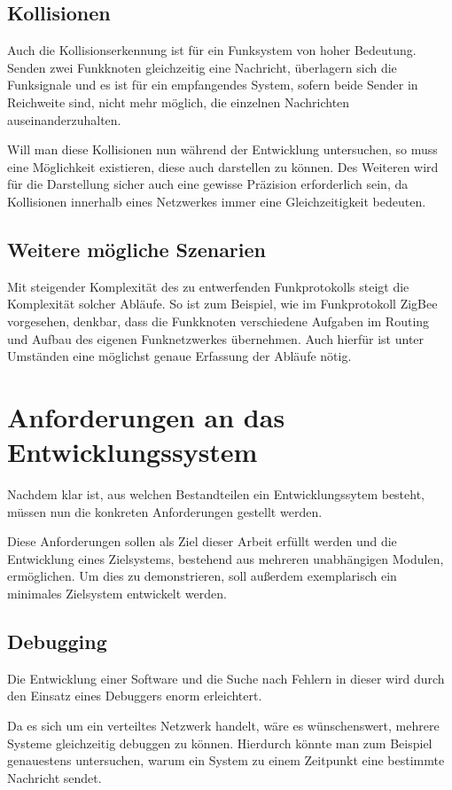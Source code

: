 \subsection{Kollisionen}\label{subs:kollision}
Auch die Kollisionserkennung ist für ein Funksystem von hoher Bedeutung. Senden
zwei Funkknoten gleichzeitig eine Nachricht, überlagern sich die Funksignale und
es ist für ein empfangendes System, sofern beide Sender in Reichweite sind,
nicht mehr möglich, die einzelnen Nachrichten auseinanderzuhalten.

Will man diese Kollisionen nun während der Entwicklung untersuchen, so muss eine
Möglichkeit existieren, diese auch darstellen zu können. Des Weiteren wird
für die Darstellung sicher auch eine gewisse Präzision erforderlich sein, da
Kollisionen innerhalb eines Netzwerkes immer eine Gleichzeitigkeit bedeuten.
\subsection{Weitere mögliche Szenarien}
Mit steigender Komplexität des zu entwerfenden Funkprotokolls steigt die
Komplexität solcher Abläufe. So ist zum Beispiel, wie im Funkprotokoll ZigBee
vorgesehen, denkbar, dass die Funkknoten verschiedene Aufgaben im Routing und
Aufbau des eigenen Funknetzwerkes übernehmen. Auch hierfür ist unter
Umständen eine möglichst genaue Erfassung der Abläufe nötig.
\section{Anforderungen an das Entwicklungssystem}
Nachdem klar ist, aus welchen Bestandteilen ein Entwicklungssytem besteht,
müssen nun die konkreten Anforderungen gestellt werden.

Diese Anforderungen sollen als Ziel dieser Arbeit erfüllt werden und die
Entwicklung eines Zielsystems, bestehend aus mehreren unabhängigen
Modulen, ermöglichen. Um dies zu demonstrieren, soll außerdem exemplarisch ein
minimales Zielsystem entwickelt werden.

\subsection{Debugging} Die Entwicklung einer Software und die Suche nach Fehlern
in dieser wird durch den Einsatz eines Debuggers enorm erleichtert.

Da es sich um ein verteiltes Netzwerk handelt, wäre es wünschenswert, mehrere
Systeme gleichzeitig debuggen zu können. Hierdurch könnte man zum Beispiel
genauestens untersuchen, warum ein System zu einem Zeitpunkt eine bestimmte
Nachricht sendet.

